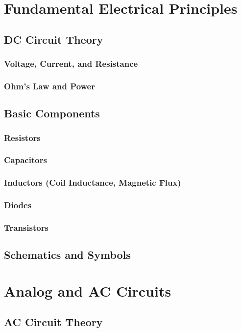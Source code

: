 \documentclass[11pt]{article}
\begin{document}
\section{Fundamental Electrical Principles} \label{sec:fundamentals}
\subsection{DC Circuit Theory} \label{subsec:dc_circuit_theory}
\subsubsection{Voltage, Current, and Resistance}
\subsubsection{Ohm's Law and Power}
\subsection{Basic Components} \label{subsec:basic_components}
\subsubsection{Resistors}
\subsubsection{Capacitors}
\subsubsection{Inductors (Coil Inductance, Magnetic Flux)}
\subsubsection{Diodes}
\subsubsection{Transistors}
\subsection{Schematics and Symbols} \label{subsec:schematics_symbols}

\section{Analog and AC Circuits} \label{sec:analog_ac}
\subsection{AC Circuit Theory} \label{subsec:ac_circuit_theory}
\end{document}
